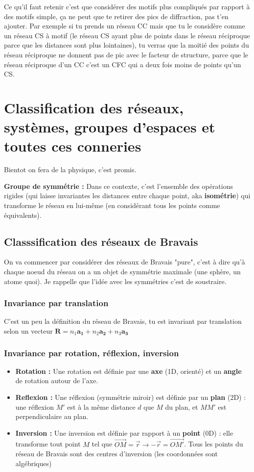 \documentclass[a4paper]{report}
\begin{document}
  Ce qu'il faut retenir c'est que considérer des motifs plus compliqués par rapport à des motifs simple, ça ne peut que te retirer des pics de diffraction, pas t'en ajouter. Par exemple si tu prends un réseau CC mais que tu le considère comme un réseau CS à motif (le réseau CS ayant plus de points dans le réseau réciproque parce que les distances sont plus lointaines), tu verras que la moitié des points du réseau réciproque ne donnent pas de pic avec le facteur de structure, parce que le réseau réciproque d'un CC c'est un CFC qui a deux fois moins de points qu'un CS.
  \chapter{Classification des réseaux, systèmes, groupes d'espaces et toutes ces conneries}
  Bientot on fera de la physique, c'est promis. 
  \begin{tcolorbox}
  \textbf{Groupe de symmétrie :} Dans ce contexte, c'est l'ensemble des opérations rigides (qui laisse invariantes les distances entre chaque point, aka \textbf{isométrie}) qui transforme le réseau en lui-même (en considérant tous les points comme équivalents).
  \end{tcolorbox}
  \section{Classsification des réseaux de Bravais}
  On va commencer par considérer des réseaux de Bravais "pure", c'est à dire qu'à chaque noeud du réseau on a un objet de symmétrie maximale (une sphère, un atome quoi). Je rappelle que l'idée avec les symmétries c'est de soustraire.
  \subsection{Invariance par translation}
  C'est un peu la définition du réseau de Bravais, tu est invariant par translation selon un vecteur $\mathbf{R}=n_1 \mathbf{a_1}+n_2 \mathbf{a_2}+n_3 \mathbf{a_3}$
  \subsection{Invariance par rotation, réflexion, inversion}
  \begin{itemize}
  \item \textbf{Rotation :} Une rotation est définie par une \textbf{axe} (1D, orienté) et un \textbf{angle} de rotation autour de l'axe.
  \item \textbf{Reflexion :} Une réflexion (symmétrie miroir) est définie par un \textbf{plan} (2D) : une réflexion $M'$ est à la même distance $d$ que $M$ du plan, et $MM'$ est perpendiculaire au plan.
  \item \textbf{Inversion :} Une inversion est définie par rapport à un \textbf{point} (0D) : elle transforme tout point $M$ tel que $\vec{OM} = \vec r \to -\vec r = \vec{OM'}$. Tous les points du réseau de Bravais sont des centres d'inversion (les coordonnées sont algébriques)
  \end{itemize}
\end{document}
